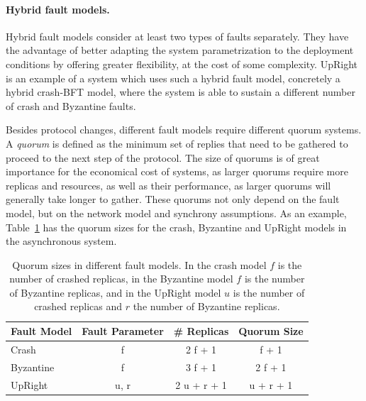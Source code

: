 \paragraph{Hybrid fault models.}
Hybrid fault models consider at least two types of faults
separately. They have the advantage of better adapting the
system parametrization to the deployment conditions by offering
greater flexibility, at the cost of some complexity.
UpRight~\cite{upright} is an example of a system which uses such
a hybrid fault model, concretely a hybrid crash-\ac{BFT} model, where
the system is able to sustain a different number of crash and
Byzantine faults. 

Besides protocol changes, different fault models require
different quorum systems. A \emph{quorum} is defined as the
minimum set of replies that need to be gathered to proceed to the
next step of the protocol. The size of quorums is of great
importance for the economical cost of systems, as larger quorums require
more replicas and resources, as well as their performance, as
larger quorums will generally take longer to gather. These
quorums not only depend on the fault model, but on the network
model and synchrony assumptions. As an example,
Table~\ref{tab:quorum} has the quorum sizes for the crash,
Byzantine and UpRight models in the asynchronous system.

\begin{table}[ht]
    \centering
    \caption{Quorum sizes in different fault models. In the crash
    model $f$ is the number of crashed replicas, in the Byzantine
    model $f$ is the number of Byzantine replicas, and in the
    UpRight model $u$ is the number of crashed replicas and $r$
    the number of Byzantine replicas.}
    \begin{tabular}{|l|c|c|c|}
        \hline
        \textbf{Fault Model} & \textbf{Fault Parameter} & \textbf{\# Replicas} & \textbf{Quorum Size} \\
        \hline
        Crash & f & 2 f + 1 & f + 1 \\
        \hline
        Byzantine & f & 3 f + 1 & 2 f + 1 \\
        \hline
        UpRight & u, r & 2 u + r + 1 & u + r + 1 \\
        \hline
    \end{tabular}\label{tab:quorum}
\end{table}

